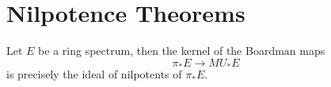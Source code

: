 \section{Nilpotence Theorems}\label{sec:chromatic-results-nilpotence}
\begin{theorem}
    Let $E$ be a ring spectrum, then the kernel of the Boardman maps
    \[
    \pi_*E\to MU_*E 
    \]is precisely the ideal of nilpotents of $\pi_*E$.
\end{theorem}